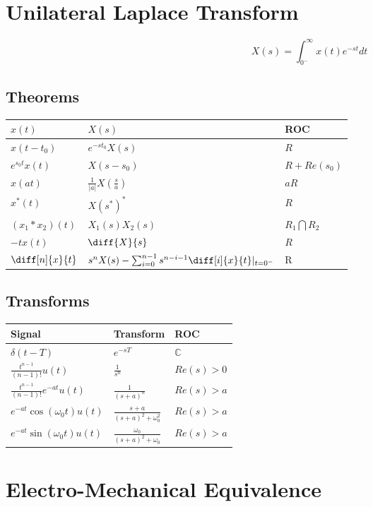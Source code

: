 

\section*{Unilateral Laplace Transform}
$$X(s) = \int_{0^-}^\infty{x(t)e^{-st}dt}$$
\subsection*{Theorems}
\begin{center}
    \begin{tabularx}{\textwidth}{XXX}
        \hline
	$x(t)$ & $X(s)$ & ROC\\
        \hline
	$x(t-t_0)$ & $e^{-st_0}X(s)$ & $R$\\
	$e^{s_0t}x(t)$ & $X(s-s_0)$ & $R + Re(s_0)$\\
	$x(at)$ & $\frac{1}{|a|}X\left( \frac{s}{a} \right)$ & $aR$\\
	$x^*(t)$ & $X(s^*)^*$ & $R$\\
      $(x_1*x_2)(t)$ & $X_1(s)X_2(s)$ & $R_1\bigcap R_2$\\
      $-tx(t)$ & $\diff{X}{s}$ & $R$\\
      $\diff[n]{x}{t}$ & $s^nX(s)-\sum_{i=0}^{n-1}s^{n-i-1}\diff[i]{x}{t}|_{t=0^-}$ & R
    \end{tabularx}
\end{center}
\subsection*{Transforms}
\begin{center}
    \begin{tabularx}{\textwidth}{XXX}
        \hline
        Signal & Transform & ROC\\
        \hline
	$\delta(t-T)$ & $e^{-sT}$ & $\mathbb{C}$\\
	$\frac{t^{n-1}}{(n-1)!}u(t)$ & $\frac{1}{s^n}$ & $Re(s)>0$\\
	$\frac{t^{n-1}}{(n-1)!}e^{-at}u(t)$ & $\frac{1}{(s+a)^n}$ & $Re(s) > a$\\
	$e^{-at}\cos(\omega_0t)u(t)$ & $\frac{s+a}{(s+a)^2+\omega_0^2}$ & $Re(s) > a$\\
	$e^{-at}\sin(\omega_0t)u(t)$ & $\frac{\omega_0}{(s+a)^2+\omega_0}$ & $Re(s) > a$
    \end{tabularx}
\end{center}
\clearpage
\section*{Electro-Mechanical Equivalence}
